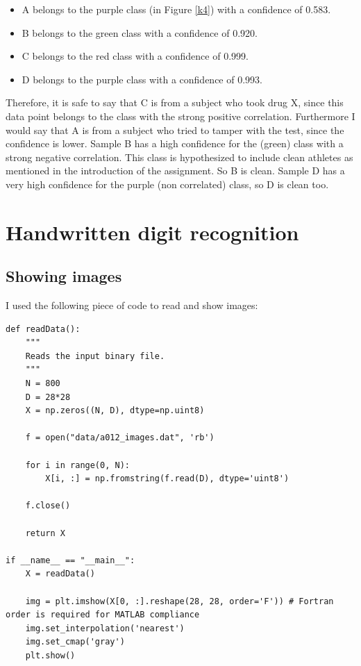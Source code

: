 \documentclass[paper=a4, fontsize=10pt]{scrartcl} %
\numberwithin{equation}{section} %
\numberwithin{figure}{section} %
\numberwithin{table}{section} %
\begin{document}
\begin{itemize}
\item A belongs to the purple class (in Figure \ref{k4}) with a confidence of 0.583.
\item B belongs to the green class with a confidence of 0.920.
\item C belongs to the red class with a confidence of 0.999.
\item D belongs to the purple class with a confidence of 0.993.
\end{itemize}

Therefore, it is safe to say that C is from a subject who took drug X, since this data point belongs to the class with the strong positive correlation. Furthermore I would say that A is from a subject who tried to tamper with the test, since the confidence is lower. Sample B has a high confidence for the (green) class with a strong negative correlation. This class is hypothesized to include clean athletes as mentioned in the introduction of the assignment. So B is clean. Sample D has a very high confidence for the purple (non correlated) class, so D is clean too.

\section{Handwritten digit recognition}
\subsection{Showing images}
I used the following piece of code to read and show images:
\begin{verbatim}
def readData():
	"""
	Reads the input binary file.
	"""
	N = 800
	D = 28*28
	X = np.zeros((N, D), dtype=np.uint8)

	f = open("data/a012_images.dat", 'rb')

	for i in range(0, N):
		X[i, :] = np.fromstring(f.read(D), dtype='uint8')

	f.close()

	return X

if __name__ == "__main__":
	X = readData()
	
	img = plt.imshow(X[0, :].reshape(28, 28, order='F')) # Fortran order is required for MATLAB compliance
	img.set_interpolation('nearest')
	img.set_cmap('gray')
	plt.show()
\end{verbatim}
\end{document}
